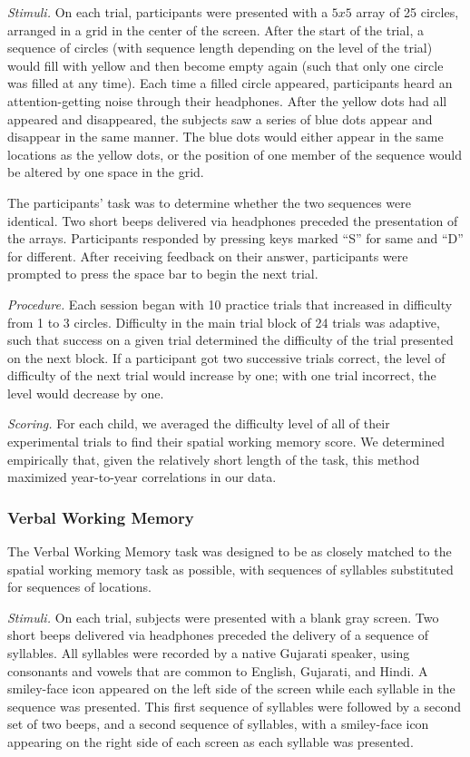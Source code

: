 \documentclass[11pt]{article}
\begin{document}
{\it Stimuli.} On each trial, participants were presented with a $5x5$ array of 25 circles, arranged in a grid in the center of the screen. After the start of the trial, a sequence of circles (with sequence length depending on the level of the trial) would fill with yellow and then become empty again (such that only one circle was filled at any time). Each time a filled circle appeared, participants heard an attention-getting noise through their headphones. After the yellow dots had all appeared and disappeared, the subjects saw a series of blue dots appear and disappear in the same manner. The blue dots would either appear in the same locations as the yellow dots, or the position of one member of the sequence would be altered by one space in the grid.

The participants' task was to determine whether the two sequences were identical. Two short beeps delivered via headphones preceded the presentation of the arrays. Participants responded by pressing keys marked ``S'' for same and ``D'' for different. After receiving feedback on their answer, participants were prompted to press the space bar to begin the next trial.

{\it Procedure.} Each session began with 10 practice trials that increased in difficulty from 1 to 3 circles. Difficulty in the main trial block of 24 trials was adaptive, such that success on a given trial determined the difficulty of the trial presented on the next block. If a participant got two successive trials correct, the level of difficulty of the next trial would increase by one; with one trial incorrect, the level would decrease by one.

{\it Scoring.} For each child, we averaged the difficulty level of all of their experimental trials to find their spatial working memory score. We determined empirically that, given the relatively short length of the task, this method maximized year-to-year correlations in our data.

\subsubsection{Verbal Working Memory}

The Verbal Working Memory task was designed to be as closely matched to the spatial working memory task as possible, with sequences of syllables substituted for sequences of locations.

{\it Stimuli.} On each trial, subjects were presented with a blank gray screen. Two short beeps delivered via headphones preceded the delivery of a sequence of syllables. All syllables were recorded by a native Gujarati speaker, using consonants and vowels that are common to English, Gujarati, and Hindi. A smiley-face icon appeared on the left side of the screen while each syllable in the sequence was presented. This first sequence of syllables were followed by a second set of two beeps, and a second sequence of syllables, with a smiley-face icon appearing on the right side of each screen as each syllable was presented.
\end{document}
